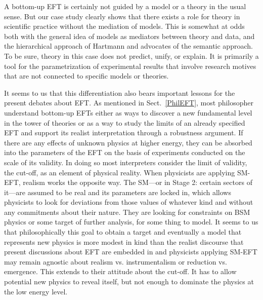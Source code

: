A bottom-up EFT is certainly not guided by a model or a theory in the usual sense. But our case study clearly shows that there exists a role for theory in scientific practice without the mediation of models. 
This is somewhat at odds both with the general idea of models as mediators between theory and data, and the hierarchical approach of Hartmann and advocates of the semantic approach. 
To be sure, theory in this case does not predict, unify, or explain. 
It is primarily a tool for the parametrization of experimental results that involve research motives that are not connected to specific models or theories.

It seems to us that this differentiation also bears important lessons for the present debates about EFT. 
As mentioned in Sect.~\ref{PhilEFT}, most philosopher understand bottom-up EFTs either as ways to discover a new fundamental level in the tower of theories  or as a way to study the limits of an already specified EFT and support its realist interpretation through a robustness argument. 
If there are any effects of unknown physics at higher energy, they can be absorbed into the parameters of the EFT on the basis of experiments conducted on the scale of its validity. 
In doing so most interpreters consider the limit of validity, the cut-off, as an element of physical reality. When physicists are applying SM-EFT, realism works the opposite way. 
The SM---or in Stage 2: certain sectors of it---are assumed to be real and its parameters are locked in, which allows physicists to look for deviations from those values of whatever kind and without any commitments about their nature. 
They are looking for constraints on BSM physics or some target of further analysis, for some thing to model. 
It seems to us that philosophically this goal to obtain a target and eventually a model that represents new physics is more modest in kind than the realist discourse that present discussions about EFT are embedded in and physicists applying SM-EFT may remain agnostic about realism vs. instrumentalism or reduction vs. emergence. 
This extends to their attitude about the cut-off. It has to allow potential new physics to reveal itself, but not enough to dominate the physics at the low energy level.
